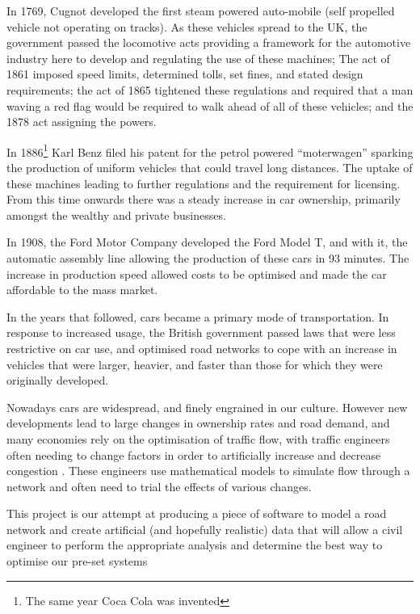 	In 1769, Cugnot developed the first steam powered auto-mobile \cite{eckermann2001world} (self propelled vehicle not operating on tracks). As these vehicles spread to the UK, the government passed the locomotive acts providing a framework for the automotive industry here to develop and regulating the use of these machines; The act of 1861 imposed speed limits, determined tolls, set fines, and stated design requirements; the act of 1865 tightened these regulations and required that a man waving a red flag would be required to walk ahead of all of these vehicles; and the 1878 act assigning the powers.
	
	In 1886\footnote{The same year Coca Cola was invented} Karl Benz filed his patent for the petrol powered ``moterwagen'' \cite{benzpatent} sparking the production of uniform vehicles that could travel long distances. The uptake of these machines leading to further regulations and the requirement for licensing. From this time onwards there was a steady increase in car ownership, primarily amongst the wealthy and private businesses.

	In 1908, the Ford Motor Company developed the Ford Model T, and with it, the automatic assembly line allowing the production of these cars in 93 minutes. The increase in production speed allowed costs to be optimised and made the car affordable to the mass market.
	
	In the years that followed, cars became a primary mode of transportation. In response to increased usage, the British government passed laws that were less restrictive on car use, and optimised road networks to cope with an increase in vehicles that were larger, heavier, and faster than those for which they were originally developed.
	
	Nowadays cars are widespread, and finely engrained in our culture\cite{miller2001car}\cite{berdahl2000go}. However new developments lead to large changes in ownership rates and road demand, and many economies rely on the optimisation of traffic flow, with traffic engineers often needing to change factors in order to artificially increase and decrease congestion \cite{blunden1983congestion}. These engineers use mathematical models to simulate flow through a network and often need to trial the effects of various changes.
	
	This project is our attempt at producing a piece of software to model a road network and create artificial (and hopefully realistic) data that will allow a civil engineer to perform the appropriate analysis and determine the best way to optimise our pre-set systems 